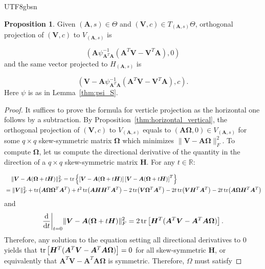 \documentclass[12pt]{report}
\newcommand\tab[1][1cm]{\hspace*{#1}}
\newcommand{\bracket}[1]{\left ( #1 \right )}
\newcommand{\curly}[1]{\left \{ #1 \right \} }
\newcommand{\squared}[1]{\left [ #1 \right ]}
\theoremstyle{plain}
\theoremstyle{definition}
\newtheorem{proposition}[theorem]{Proposition}
\begin{document}
\begin{CJK*}{UTF8}{gbsn}
\begin{proposition}\label{thm:projection}
Given $(\bm{A}, s) \in \Theta$ and $(\bm{V}, c) \in T_{(\bm{A}, s)}\Theta$,
orthogonal projection of $(\bm{V}, c)$ to $V_{(\bm{A}, s)}$ 
is

\begin{equation*}
  \bracket{\bm{A} \psi_{\bm{A}^T\bm{A}}^{-1}(\bm{A}^T \bm{V} - \bm{V}^T \bm{A}), 0}
\end{equation*}
and the same vector projected
to $H_{(\bm{A}, s)}$ is

\begin{equation}\label{eq:horizontal_projection}
  \bracket{\bm{V} - \bm{A} \psi_{\bm{A}^T\bm{A}}^{-1}(\bm{A}^T \bm{V} - \bm{V}^T \bm{A}), c}.
\end{equation}
Here $\psi$ is as in Lemma~\ref{thm:psi_S}.
\end{proposition}

\begin{proof}
It suffices to prove the formula for verticle projection 
as the horizontal one follows by a subtraction.
By Proposition~\ref{thm:horizontal_vertical},
the orthogonal projection of $(\bm{V}, c)$ to $V_{(\bm{A}, s)}$
equals to $(\bm{A} \bm{\Omega}, 0) \in V_{(\bm{A}, s)}$ for some $q \times q$ skew-symmetric matrix $\bm{\Omega}$
which minimizes $\|\bm{V}-	\bm{A} \bm{\Omega}\|_F^2$.
To compute $\bm{\Omega}$, let us compute the directional derivative of the quantity 
in the direction of a $q \times q$ skew-symmetric matrix $\bm{H}$.
For any $t \in \mathbb{R}$:

\begin{equation*}
  \begin{split}
  & \tab[0.4cm] \|\bm{V}-	\bm{A} (\bm{\Omega} + t\bm{H}) \|_F^2 
  = \tr\curly{\squared{\bm{V}-	\bm{A} (\bm{\Omega} + t\bm{H})}\squared{\bm{V}-	\bm{A} (\bm{\Omega} + t\bm{H})}^T}
  \\ & = 
  \|\bm{V}\|_F^2 + \tr(\bm{A}\bm{\Omega}\bm{\Omega}^T\bm{A}^T ) + t^2 
  \tr(\bm{A}\bm{H}\bm{H}^T\bm{A}^T )
  - 2 \tr(\bm{V}\bm{\Omega}^T\bm{A}^T ) - 2t \tr(\bm{V}\bm{H}^T\bm{A}^T )
-2t \tr(\bm{A}\bm{\Omega}\bm{H}^T\bm{A}^T ) 
  \end{split}
\end{equation*}
and 
\begin{equation*}
  \frac{\mathrm{d}}{\mathrm{d} t} \bigg|_{t=0}   \|\bm{V}-	\bm{A} (\bm{\Omega} + t\bm{H}) \|_F^2 
  = 2 \tr \squared{\bm{H}^T (\bm{A}^T \bm{V}-\bm{A}^T\bm{A}\bm{\Omega})}.
\end{equation*}
Therefore, any solution to the equation setting all directional derivatives to $0$
yields that $\tr \squared{\bm{H}^T (\bm{A}^T \bm{V}-\bm{A}^T\bm{A}\bm{\Omega})} = 0$
for all skew-symmetric $\bm{H}$,
or equivalently that $\bm{A}^T \bm{V}-\bm{A}^T\bm{A}\bm{\Omega}$ is symmetric.
Therefore, $\Omega$ must satisfy 


\end{proof}
\end{CJK*}
\end{document}
